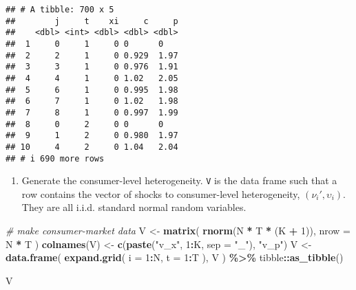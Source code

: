 \documentclass[
]{book}
\newenvironment{Shaded}{\begin{snugshade}}{\end{snugshade}}
\newcommand{\AttributeTok}[1]{\textcolor[rgb]{0.13,0.29,0.53}{#1}}
\newcommand{\CommentTok}[1]{\textcolor[rgb]{0.56,0.35,0.01}{\textit{#1}}}
\newcommand{\DecValTok}[1]{\textcolor[rgb]{0.00,0.00,0.81}{#1}}
\newcommand{\FunctionTok}[1]{\textcolor[rgb]{0.13,0.29,0.53}{\textbf{#1}}}
\newcommand{\NormalTok}[1]{#1}
\newcommand{\OtherTok}[1]{\textcolor[rgb]{0.56,0.35,0.01}{#1}}
\newcommand{\SpecialCharTok}[1]{\textcolor[rgb]{0.81,0.36,0.00}{\textbf{#1}}}
\newcommand{\StringTok}[1]{\textcolor[rgb]{0.31,0.60,0.02}{#1}}
\providecommand{\tightlist}{%
  \setlength{\itemsep}{0pt}\setlength{\parskip}{0pt}}
\begin{document}
\begin{verbatim}
## # A tibble: 700 x 5
##        j     t    xi     c     p
##    <dbl> <int> <dbl> <dbl> <dbl>
##  1     0     1     0 0      0   
##  2     2     1     0 0.929  1.97
##  3     3     1     0 0.976  1.91
##  4     4     1     0 1.02   2.05
##  5     6     1     0 0.995  1.98
##  6     7     1     0 1.02   1.98
##  7     8     1     0 0.997  1.99
##  8     0     2     0 0      0   
##  9     1     2     0 0.980  1.97
## 10     4     2     0 1.04   2.04
## # i 690 more rows
\end{verbatim}

\begin{enumerate}
\def\labelenumi{\arabic{enumi}.}
\setcounter{enumi}{3}
\tightlist
\item
  Generate the consumer-level heterogeneity. \texttt{V} is the data frame such that a row contains the vector of shocks to consumer-level heterogeneity, \((\nu_{i}', \upsilon_i)\). They are all i.i.d. standard normal random variables.
\end{enumerate}

\begin{Shaded}
\begin{Highlighting}[]
\CommentTok{\# make consumer{-}market data}
\NormalTok{V }\OtherTok{\textless{}{-}} 
  \FunctionTok{matrix}\NormalTok{(}
    \FunctionTok{rnorm}\NormalTok{(N }\SpecialCharTok{*}\NormalTok{ T }\SpecialCharTok{*}\NormalTok{ (K }\SpecialCharTok{+} \DecValTok{1}\NormalTok{)), }
    \AttributeTok{nrow =}\NormalTok{ N }\SpecialCharTok{*}\NormalTok{ T}
\NormalTok{    ) }
\FunctionTok{colnames}\NormalTok{(V) }\OtherTok{\textless{}{-}} \FunctionTok{c}\NormalTok{(}\FunctionTok{paste}\NormalTok{(}\StringTok{"v\_x"}\NormalTok{, }\DecValTok{1}\SpecialCharTok{:}\NormalTok{K, }\AttributeTok{sep =} \StringTok{"\_"}\NormalTok{), }\StringTok{"v\_p"}\NormalTok{)}
\NormalTok{V }\OtherTok{\textless{}{-}} 
  \FunctionTok{data.frame}\NormalTok{(}
    \FunctionTok{expand.grid}\NormalTok{(}
      \AttributeTok{i =} \DecValTok{1}\SpecialCharTok{:}\NormalTok{N, }
      \AttributeTok{t =} \DecValTok{1}\SpecialCharTok{:}\NormalTok{T}
\NormalTok{      ),}
\NormalTok{    V}
\NormalTok{    ) }\SpecialCharTok{\%\textgreater{}\%}
\NormalTok{  tibble}\SpecialCharTok{::}\FunctionTok{as\_tibble}\NormalTok{()}
\end{Highlighting}
\end{Shaded}

\begin{Shaded}
\begin{Highlighting}[]
\NormalTok{V}
\end{Highlighting}
\end{Shaded}
\end{document}
